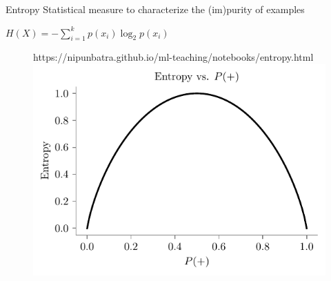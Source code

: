 \documentclass[usenames,dvipsnames]{beamer}
\begin{document}

\begin{frame}{Entropy}
 Statistical measure to characterize the
(im)purity of examples

\pause $H(X) = -\sum_{i=1}^k p(x_i) \log_2 p(x_i)$

\begin{figure}[htp]
    \centering
    \begin{notebookbox}{https://nipunbatra.github.io/ml-teaching/notebooks/entropy.html}
      \includegraphics[scale=0.6]{../assets/decision-trees/figures/entropy.pdf}
    \end{notebookbox}
  \end{figure}

\end{frame}
	
\end{document}
